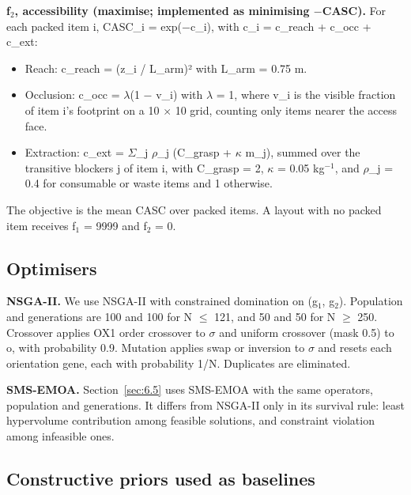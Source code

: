 \documentclass[journal]{IEEEtran}
\providecommand{\tightlist}{\setlength{\itemsep}{0pt}\setlength{\parskip}{0pt}}
\begin{document}
\textbf{f\(_2\), accessibility (maximise; implemented as minimising \(-\)CASC).} For each packed item i, CASC\_i = exp(\(-\)c\_i), with c\_i = c\_reach + c\_occ + c\_ext:

\begin{itemize}
\tightlist
\item
  Reach: c\_reach = (z\_i / L\_arm)² with L\_arm = 0.75 m.
\item
  Occlusion: c\_occ = \(\lambda\)(1 \(-\) v\_i) with \(\lambda\) = 1, where v\_i is the visible fraction of item i's footprint on a 10 \(\times\) 10 grid, counting only items nearer the access face.
\item
  Extraction: c\_ext = \(\Sigma\)\_j \(\rho\)\_j (C\_grasp + \(\kappa\) m\_j), summed over the transitive blockers j of item i, with C\_grasp = 2, \(\kappa\) = 0.05 kg\(^{-1}\), and \(\rho\)\_j = 0.4 for consumable or waste items and 1 otherwise.
\end{itemize}

The objective is the mean CASC over packed items. A layout with no packed item receives f\(_1\) = 9999 and f\(_2\) = 0.

\subsection{Optimisers}\label{sec:3.3}

\textbf{NSGA-II.} We use NSGA-II with constrained domination on (g\(_1\), g\(_2\)). Population and generations are 100 and 100 for N \(\le\) 121, and 50 and 50 for N \(\ge\) 250. Crossover applies OX1 order crossover to \(\sigma\) and uniform crossover (mask 0.5) to o, with probability 0.9. Mutation applies swap or inversion to \(\sigma\) and resets each orientation gene, each with probability 1/N. Duplicates are eliminated.

\textbf{SMS-EMOA.} Section~\ref{sec:6.5} uses SMS-EMOA with the same operators, population and generations. It differs from NSGA-II only in its survival rule: least hypervolume contribution among feasible solutions, and constraint violation among infeasible ones.

\subsection{Constructive priors used as baselines}\label{sec:3.4}
\end{document}
